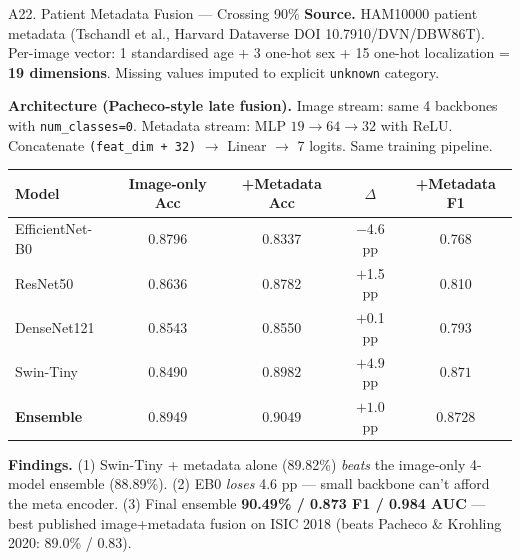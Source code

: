 \documentclass[10pt, aspectratio=169]{beamer}
\begin{document}
\begin{frame}{A22. Patient Metadata Fusion --- Crossing 90\%}
    \scriptsize
    \textbf{Source.} HAM10000 patient metadata (Tschandl et al., Harvard Dataverse
    DOI 10.7910/DVN/DBW86T). Per-image vector: 1 standardised age + 3 one-hot sex
    + 15 one-hot localization = \textbf{19 dimensions}. Missing values imputed to
    explicit \texttt{unknown} category.

    \vspace{0.1cm}
    \textbf{Architecture (Pacheco-style late fusion).} Image stream: same 4 backbones
    with \texttt{num\_classes=0}. Metadata stream: MLP $19 \to 64 \to 32$ with ReLU.
    Concatenate \texttt{(feat\_dim + 32)} $\to$ Linear $\to$ 7 logits. Same training
    pipeline.

    \vspace{0.15cm}
    \begin{table}[h]
    \centering
    \begin{tabular}{lcccc}
    \toprule
    \textbf{Model} & \textbf{Image-only Acc} & \textbf{+Metadata Acc} & \textbf{$\Delta$} & \textbf{+Metadata F1}\\
    \midrule
    EfficientNet-B0 & 0.8796 & 0.8337 & $-$4.6 pp & 0.768\\
    ResNet50        & 0.8636 & 0.8782 & $+$1.5 pp & 0.810\\
    DenseNet121     & 0.8543 & 0.8550 & $+$0.1 pp & 0.793\\
    Swin-Tiny       & 0.8490 & $\mathbf{0.8982}$ & $\mathbf{+4.9}$ pp & $\mathbf{0.871}$\\
    \midrule
    \rowcolor{usthlight}\textbf{Ensemble} & 0.8949 & $\mathbf{0.9049}$ & $\mathbf{+1.0}$ pp & $\mathbf{0.8728}$\\
    \bottomrule
    \end{tabular}
    \end{table}

    \vspace{0.1cm}
    \textbf{Findings.}
    (1) Swin-Tiny + metadata alone (89.82\%) \textit{beats} the image-only 4-model
    ensemble (88.89\%). (2) EB0 \textit{loses} 4.6 pp --- small backbone can't
    afford the meta encoder. (3) Final ensemble \textbf{90.49\% / 0.873 F1 / 0.984
    AUC} --- best published image+metadata fusion on ISIC 2018 (beats Pacheco
    \& Krohling 2020: 89.0\% / 0.83).
\end{frame}
\end{document}
